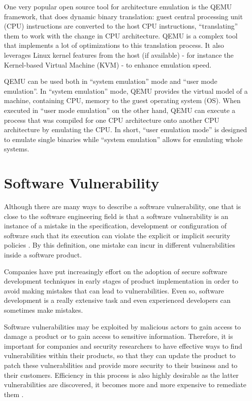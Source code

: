 One very popular open source tool for architecture emulation is the QEMU \cite{qemu} framework, that does dynamic binary translation: guest central processing unit (CPU) instructions are converted to the host CPU instructions, ``translating'' them to work with the change in CPU architecture. QEMU is a complex tool that implements a lot of optimizations to this translation process. It also leverages Linux kernel features from the host (if available) - for instance the Kernel-based Virtual Machine (KVM) - to enhance emulation speed.

QEMU can be used both in ``system emulation'' mode and ``user mode emulation''. In ``system emulation'' mode, QEMU provides the virtual model of a machine, containing CPU, memory to the guest operating system (OS). When executed in ``user mode emulation'' on the other hand, QEMU can execute a process that was compiled for one CPU architecture onto another CPU architecture by emulating the CPU. In short, ``user emulation mode'' is designed to emulate single binaries while ``system emulation'' allows for emulating whole systems.

\section{Software Vulnerability}

Although there are many ways to describe a software vulnerability, one that is close to the software engineering field is that a software vulnerability is an instance of a mistake in the specification, development or configuration of software such that its execution can violate the explicit or implicit security policies \cite{vuln-discovery}. By this definition, one mistake can incur in different vulnerabilities inside a software product.

Companies have put increasingly effort on the adoption of secure software development techniques in early stages of product implementation in order to avoid making mistakes that can lead to vulnerabilities. Even so, software development is a really extensive task and even experienced developers can sometimes make mistakes.

Software vulnerabilities may be exploited by malicious actors to gain access to damage a product or to gain access to sensitive information. Therefore, it is important for companies and security researchers to have effective ways to find vulnerabilities within their products, so that they can update the product to patch these vulnerabilities and provide more security to their business and to their customers. Efficiency in this process is also highly desirable as the latter vulnerabilities are discovered, it becomes more and more expensive to remediate them \cite{soft-eng-economics}.

